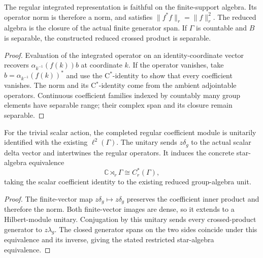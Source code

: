 \begin{proposition}\label{prop:reduced-crossed-norm-separability}
\leanok
The regular integrated representation is faithful on the finite-support
algebra. Its operator norm is therefore a norm, and satisfies
$\|f^*f\|_r=\|f\|_r^2$. The reduced algebra is the closure of the
actual finite generator span. If $\Gamma$ is countable and $B$ is
separable, the constructed reduced crossed product is separable.
\end{proposition}
\begin{proof}
\leanok
Evaluation of the integrated operator on an identity-coordinate vector
recovers $\alpha_{k^{-1}}(f(k))b$ at coordinate $k$. If the operator
vanishes, take $b=\alpha_{k^{-1}}(f(k))^*$ and use the C$^*$-identity
to show that every coefficient vanishes. The norm and its C$^*$-identity
come from the ambient adjointable operators. Continuous coefficient
families indexed by countably many group elements have separable range;
their complex span and its closure remain separable.
\end{proof}

\begin{proposition}\label{prop:scalar-reduced-crossed-product}
\leanok
For the trivial scalar action, the completed regular coefficient module
is unitarily identified with the existing $\ell^2(\Gamma)$. The unitary
sends $z\delta_g$ to the actual scalar delta vector and intertwines
the regular operators. It induces the concrete star-algebra equivalence
\[
 \mathbb C\rtimes_r\Gamma\cong C_r^*(\Gamma),
\]
taking the scalar coefficient identity to the existing reduced
group-algebra unit.
\end{proposition}
\begin{proof}
\leanok
The finite-vector map $z\delta_g\mapsto z\delta_g$ preserves the
coefficient inner product and therefore the norm. Both finite-vector
images are dense, so it extends to a Hilbert-module unitary.
Conjugation by this unitary sends every crossed-product generator to
$z\lambda_g$. The closed generator spans on the two sides coincide
under this equivalence and its inverse, giving the stated restricted
star-algebra equivalence.
\end{proof}

